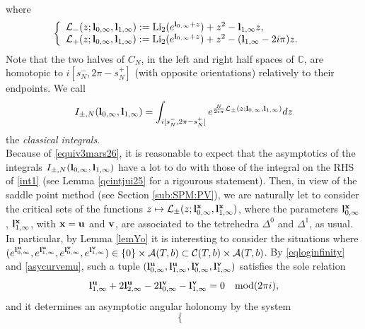 \documentclass[11pt]{amsart}
\newcommand{\mc}{\mathbb{C}}
\newcommand{\bu}{{\bf u}}
\newcommand{\bx}{{\bf x}}
\newcommand{\bv}{{\bf v}}
\newcommand{\bl}{{\bf l}}
\begin{document}
{\begin{multline}
\end{multline}
where 
\begin{equation}\label{defL+-}
\left\lbrace\begin{array}{ll}
\mathcal{L}_-(z;\bl_{0,\infty},\bl_{1,\infty}) := {\rm Li}_2(e^{\bl_{0,\infty} + z})+z^2- \bl_{1,\infty} z,& \\
\mathcal{L}_+(z;\bl_{0,\infty},\bl_{1,\infty}) := {\rm Li}_2(e^{\bl_{0,\infty} + z})+z^2 -(\bl_{1,\infty}-2i\pi) z. &
\end{array}\right.
\end{equation}
Note that the two halves of $C_N$, in the left and right half spaces of $\mc$, are homotopic to $i[s_N^-,2\pi-s_N^+]$ (with opposite orientations) relatively to their endpoints. We call 
\begin{equation}
I_{\pm,N}(\bl_{0,\infty},\bl_{1,\infty}) = \int_{i[s_N^-,2\pi-s_N^+]} e^{\frac{N}{2i\pi}\mathcal{L}_\pm(z;\bl_{0,\infty},\bl_{1,\infty})}dz\label{I+}
\end{equation}
the {\it classical integrals}.\\
Because of \eqref{equiv3mars26}, it is reasonable to expect that the asymptotics of the integrals $I_{\pm,N}(\bl_{0,\infty},\bl_{1,\infty})$ have a lot to do with those of the integral on the RHS of \eqref{int1} (see Lemma \ref{qcintjui25} for a rigourous statement). Then, in view of the saddle point method (see Section \ref{sub:SPM:PV}), we are naturally let to consider the critical sets of the functions $z\mapsto \mathcal{L}_\pm(z;\bl_{0,\infty}^\bx,\bl_{1,\infty}^\bx)$, where the parameters $\bl_{0,\infty}^\bx$, $\bl_{1,\infty}^\bx$, with $\bx=\bu$ and $\bv$, are associated to the tetrehedra $\Delta^0$ and $\Delta^1$, as usual. In particular, by Lemma \ref{lemYo} it is interesting to consider the situations where $(e^{\bl_{0,\infty}^{\bu}},e^{\bl_{1,\infty}^{\bu}},e^{\bl_{0,\infty}^{\bv}},e^{\bl_{1,\infty}^{\bv}}) \in \{0\}\times \mathcal{A}(T,b)\subset\mathcal{C}(T,b)\times \mathcal{A}(T,b)$. By \eqref{eqloginfinity} and \eqref{asycurvemu}, such a tuple $(\bl_{0,\infty}^{\bu}, \bl_{1,\infty}^{\bu},\bl_{0,\infty}^{\bv}, \bl_{1,\infty}^{\bv})$ satisfies the sole relation
\begin{equation}\label{asycurvelog}
\bl_{1,\infty}^{\bu}+2\bl_{2,\infty}^{\bu}-2\bl_{0,\infty}^{\bv}-\bl_{1,\infty}^{\bv} = 0 \quad {\rm mod}(2\pi i),
\end{equation}
and it determines an asymptotic angular holonomy by the system 
\begin{equation}\label{asycurvelog2}
\left\lbrace\begin{array}{ll} 

\end{array}
\end{equation}}
\end{document}
